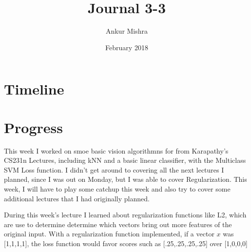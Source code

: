 \documentclass[11pt]{article}
\author{Ankur Mishra}
\date{February 2018}
\title{Journal 3-3}
\begin{document}
\maketitle
\tableofcontents

\section{Timeline}
\label{sec-1}
\section{Progress}
\label{sec-2}
This week I worked on smoe basic vision algorithmns for from Karapathy's CS231n Lectures, including kNN and a basic linear classifier, with the Multiclass SVM Loss function. 
I didn't get around to covering all the next lectures I planned, since I was out on Monday, but I was able to cover Regularization. This week, I will have to play some catchup this week and also try to cover 
some additional lectures that I had originally planned.
\par
During this week's lecture I learned about regularization functions like L2, which are use to determine
determine which vectors bring out more features of the original input. With a regularization function implemented,
if a vector $x$ was [1,1,1,1], the loss function would favor scores such as
[.25,.25,.25,.25] over [1,0,0,0]
\end{document}
